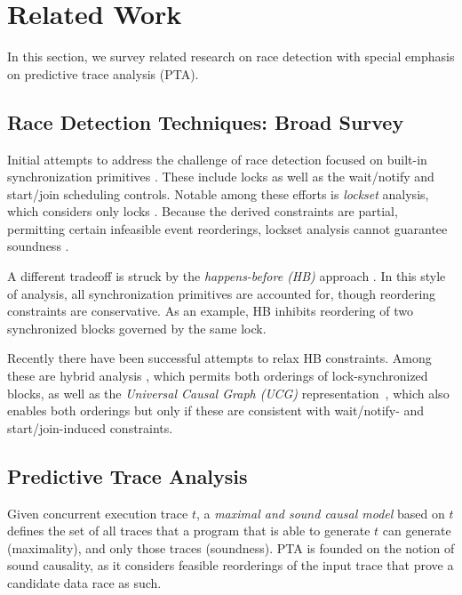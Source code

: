 \section{Related Work}

In this section, we survey related research on race detection with special emphasis on predictive trace analysis (PTA).

\subsection{Race Detection Techniques: Broad Survey} 

Initial attempts to address the challenge of race detection focused on built-in synchronization primitives \cite{XXX,YYY}. These include locks as well as the wait/notify and start/join scheduling controls. Notable among these efforts is \emph{lockset} analysis, which considers only locks \cite{XXX}. Because the derived constraints are partial, permitting certain infeasible event reorderings, lockset analysis cannot guarantee soundness \cite{Huang}. 

A different tradeoff is struck by the \emph{happens-before (HB)} approach \cite{Lamport}. In this style of analysis, all synchronization primitives are accounted for, though reordering constraints are conservative. As an example, HB inhibits reordering of two synchronized blocks governed by the same lock. 


Recently there have been successful attempts to relax HB constraints. Among these are hybrid analysis \cite{XXX}, which permits both orderings of lock-synchronized blocks, as well as the \emph{Universal Causal Graph (UCG)} representation~\cite{ucg}, which also enables both orderings but only if these are consistent with wait/notify- and start/join-induced constraints.

\subsection{Predictive Trace Analysis}

Given concurrent execution trace $t$, a \emph{maximal and sound causal model} based on $t$ defines the set of all traces that a program that is able to generate $t$ can generate (maximality), and only those traces (soundness). PTA is founded on the notion of sound causality, as it considers feasible reorderings of the input trace that prove a candidate data race as such. 

